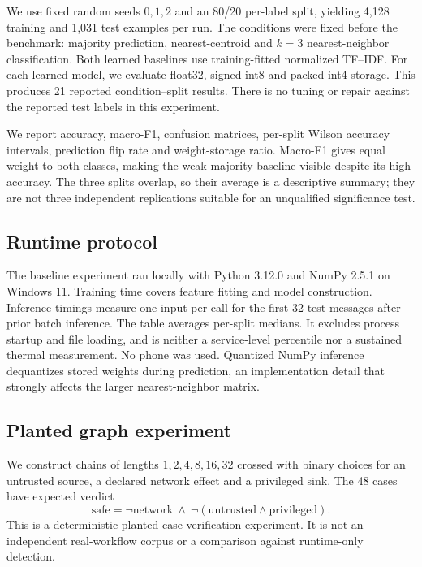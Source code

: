 \documentclass[11pt,a4paper]{article}
\begin{document}
We use fixed random seeds $0,1,2$ and an 80/20 per-label split, yielding 4,128
training and 1,031 test examples per run. The conditions were fixed before the
benchmark: majority prediction, nearest-centroid and $k=3$ nearest-neighbor
classification. Both learned baselines use training-fitted normalized TF--IDF.
For each learned model, we evaluate float32, signed int8 and packed int4 storage.
This produces 21 reported condition--split results. There is no tuning or repair
against the reported test labels in this experiment.

We report accuracy, macro-F1, confusion matrices, per-split Wilson accuracy
intervals, prediction flip rate and weight-storage ratio. Macro-F1 gives equal
weight to both classes, making the weak majority baseline visible despite its
high accuracy. The three splits overlap, so their average is a descriptive
summary; they are not three independent replications suitable for an unqualified
significance test.

\subsection{Runtime protocol}
The baseline experiment ran locally with Python 3.12.0 and NumPy 2.5.1 on
Windows 11. Training time covers feature fitting and model construction.
Inference timings measure one input per call for the first 32 test messages
after prior batch inference. The table averages per-split medians. It excludes
process startup and file loading, and is neither a service-level percentile nor
a sustained thermal measurement. No phone was used. Quantized NumPy inference
dequantizes stored weights during prediction, an implementation detail that
strongly affects the larger nearest-neighbor matrix.

\subsection{Planted graph experiment}
We construct chains of lengths $1,2,4,8,16,32$ crossed with binary choices for
an untrusted source, a declared network effect and a privileged sink. The 48
cases have expected verdict
\begin{equation}
\mathrm{safe}=\neg\mathrm{network}\ \land\
\neg(\mathrm{untrusted}\land\mathrm{privileged}).
\end{equation}
This is a deterministic planted-case verification experiment. It is not an
independent real-workflow corpus or a comparison against runtime-only detection.
\end{document}

